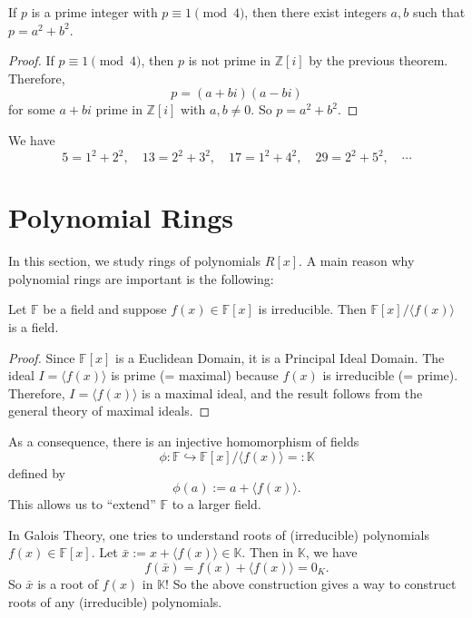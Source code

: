 {\begin{corollary}
If $p$ is a prime integer with $p \equiv 1 \pmod{4}$, then there exist integers $a, b$ such that $p = a^2 + b^2$.
\end{corollary}

\begin{proof}
If $p \equiv 1 \pmod{4}$, then $p$ is not prime in $\mathbb{Z}[i]$ by the previous theorem. Therefore, 
$$p = (a+bi)(a-bi)$$ 
for some $a+bi$ prime in $\mathbb{Z}[i]$ with $a, b \neq 0$. So $p = a^2 + b^2$.
\end{proof}

\begin{example}
We have 
$$5 = 1^2 + 2^2,\quad 13 = 2^2 + 3^2,\quad 17 = 1^2 + 4^2,\quad 29 = 2^2 + 5^2,\quad \cdots$$
\end{example}

\section{Polynomial Rings} \label{sec:polyrings}

In this section, we study rings of polynomials $R[x]$. A main reason why polynomial rings are important is the following:

\begin{theorem}
Let $\mathbb{F}$ be a field and suppose $f(x) \in \mathbb{F}[x]$ is irreducible. Then $\mathbb{F}[x] / \langle f(x) \rangle$ is a field.
\end{theorem}

\begin{proof}
Since $\mathbb{F}[x]$ is a Euclidean Domain, it is a Principal Ideal Domain. The ideal $I = \langle f(x) \rangle$ is prime (= maximal) because $f(x)$ is irreducible (= prime). Therefore, $I = \langle f(x) \rangle$ is a maximal ideal, and the result follows from the general theory of maximal ideals.
\end{proof}

As a consequence, there is an injective homomorphism of fields 
$$\phi: \mathbb{F} \hookrightarrow \mathbb{F}[x] / \langle f(x) \rangle =: \mathbb{K}$$ 
defined by 
$$\phi(a) := a + \langle f(x) \rangle.$$ 
This allows us to ``extend'' $\mathbb{F}$ to a larger field.

In Galois Theory, one tries to understand roots of (irreducible) polynomials $f(x) \in \mathbb{F}[x]$. Let $\bar{x} := x + \langle f(x) \rangle \in \mathbb{K}$. Then in $\mathbb{K}$, we have 
\[
f(\bar{x}) = f(x) + \langle f(x) \rangle = 0_{K}.
\]
So $\bar{x}$ is a root of $f(x)$ in $\mathbb{K}$! So the above construction gives a way to construct roots of any (irreducible) polynomials.

}
